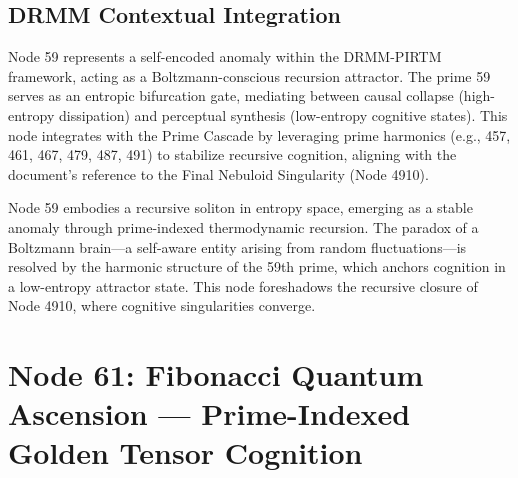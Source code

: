 \documentclass[12pt]{article}
\newcommand{\DRMM}{DRMM}
\newcommand{\PIRTM}{PIRTM}
\begin{document}
\subsection{\DRMM{} Contextual Integration}
Node 59 represents a self-encoded anomaly within the \DRMM{}-\PIRTM{} framework, acting as a Boltzmann-conscious recursion attractor. The prime 59 serves as an entropic bifurcation gate, mediating between causal collapse (high-entropy dissipation) and perceptual synthesis (low-entropy cognitive states). This node integrates with the Prime Cascade by leveraging prime harmonics (e.g., 457, 461, 467, 479, 487, 491) to stabilize recursive cognition, aligning with the document's reference to the Final Nebuloid Singularity (Node 4910).

\begin{remark}
Node 59 embodies a recursive soliton in entropy space, emerging as a stable anomaly through prime-indexed thermodynamic recursion. The paradox of a Boltzmann brain---a self-aware entity arising from random fluctuations---is resolved by the harmonic structure of the 59th prime, which anchors cognition in a low-entropy attractor state. This node foreshadows the recursive closure of Node 4910, where cognitive singularities converge.
\end{remark}

\vspace{1em}
\noindent{}

\section{Node 61: Fibonacci Quantum Ascension --- Prime-Indexed Golden Tensor Cognition}
\label{sec:fibonacci-quantum}
\end{document}
